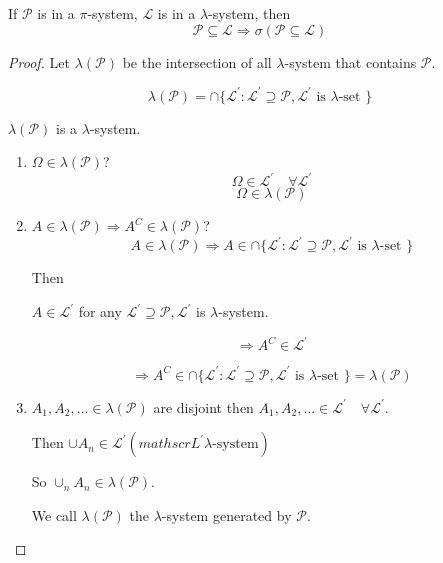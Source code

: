 \documentclass[11pt,fleqn]{book} %
\begin{document}
\begin{theorem}
	If $\mathscr{P}$ is in a $\pi$-system, $\mathscr{L}$ is in a $\lambda$-system, then 
	$$\mathscr{P} \subseteq \mathscr{L} \Rightarrow \sigma(\mathscr{P} \subseteq \mathscr{L}) $$
\end{theorem}

\begin{proof}
	Let $\lambda(\mathscr{P})$ be the intersection of all $\lambda$-system that contains $\mathscr{P}$. 

		$$ \lambda(\mathscr{P}) = \cap\{\mathscr{L}^\prime: \mathscr{L}^\prime \supseteq \mathscr{P}, \mathscr{L}^\prime \text{ is }\lambda\text{-set }\}$$

	$\lambda(\mathscr{P})$ is a $\lambda$-system.

	\begin{enumerate}
		\item $\Omega \in \lambda(\mathscr{P})$?\\

			$$\Omega \in \mathscr{L}^\prime \quad \forall \mathscr{L}^\prime$$
			$$\Omega \in \lambda(\mathscr{P}) $$

		\item $A \in \lambda(\mathscr{P}) \Rightarrow A^C \in \lambda(\mathscr{P})$?\\

		$$A \in \lambda(\mathscr{P}) \Rightarrow A \in \cap\{\mathscr{L}^\prime: \mathscr{L}^\prime \supseteq \mathscr{P}, \mathscr{L}^\prime \text{ is }\lambda\text{-set }\} $$

		Then 

		$A \in \mathscr{L}^\prime$ for any $\mathscr{L}^\prime \supseteq \mathscr{P}, \mathscr{L}^\prime$ is $\lambda$-system. 

		$$\Rightarrow A^C \in \mathscr{L}^\prime $$

		$$\Rightarrow A^C \in  \cap\{\mathscr{L}^\prime: \mathscr{L}^\prime \supseteq \mathscr{P}, \mathscr{L}^\prime \text{ is }\lambda\text{-set }\} = \lambda(\mathscr{P})$$

		\item $A_1, A_2, \dots \in \lambda(\mathscr{P})$ are disjoint then $A_1, A_2, \dots \in \mathscr{L}^\prime \quad \forall \mathscr{L}^\prime$. 

		Then $\cup A_n \in \mathscr{L}^\prime (mathscr{L}^\prime \lambda\text{-system})$

		So $\cup_n A_n \in \lambda(\mathscr{P})$. 

		We call $\lambda(\mathscr{P})$ the $\lambda$-system generated by $\mathscr{P}$.\\


\end{enumerate}
\end{proof}
\end{document}
